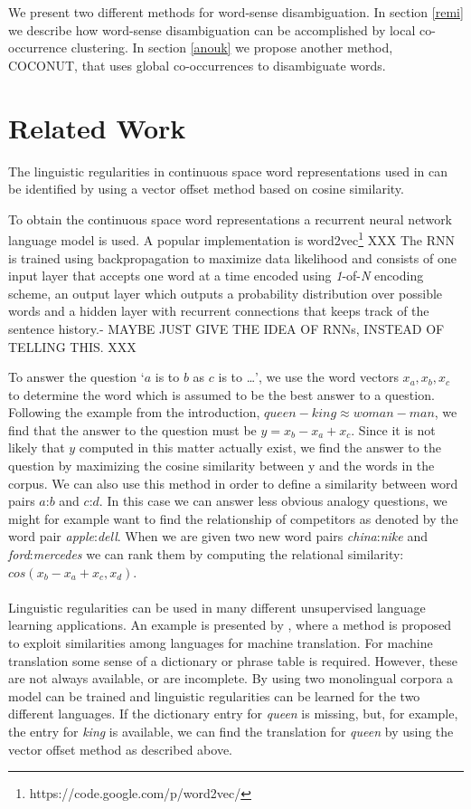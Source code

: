 \documentclass[11pt]{article}
\begin{document}
We present two different methods for word-sense disambiguation. In section \ref{remi} we describe how word-sense disambiguation can be accomplished by local co-occurrence clustering. In section \ref{anouk} we propose another method, COCONUT, that uses global co-occurrences to disambiguate words.

\section{Related Work}
The linguistic regularities in continuous space word representations used in \cite{Mikolov:13} can be identified by using a vector offset method based on cosine similarity. 

To obtain the continuous space word representations a recurrent neural network language model is used. A popular implementation is word2vec\footnote{https://code.google.com/p/word2vec/}
XXX The RNN is trained using backpropagation to maximize data likelihood and consists of one input layer that accepts one word at a time encoded using \textit{1}-of-\textit{N} encoding scheme, an output layer which outputs a probability distribution over possible words and a hidden layer with recurrent connections that keeps track of the sentence history.- MAYBE JUST GIVE THE IDEA OF RNNs, INSTEAD OF TELLING THIS. XXX

To answer the question `$a$ is to $b$ as $c$ is to \dots', we use the word vectors $x_a, x_b, x_c$ to determine the word which is assumed to be the best answer to a question. Following the example from the introduction, $\textit{queen} - \textit{king} \approx \textit{woman}  -\textit{man}$, we find that the answer to the question must be $y = x_b - x_a + x_c$. Since it is not likely that $y$ computed in this matter actually exist, we find the answer to the question by maximizing the cosine similarity between y and the words in the corpus. We can also use this method in order to define a similarity between word pairs $a$:$b$ and $c$:$d$. In this case we can answer less obvious analogy questions, we might for example want to find the relationship of competitors as denoted by the word pair \textit{apple}:\textit{dell}. When we are given two new word pairs \textit{china}:\textit{nike} and \textit{ford}:\textit{mercedes} we can rank them by computing the relational similarity: $cos(x_b - x_a + x_c, x_d)$.\\\\
Linguistic regularities can be used in many different unsupervised language learning applications. An example is presented by \cite{MikolovMT:13}, where a method is proposed to exploit similarities among languages for machine translation. For machine translation some sense of a dictionary or phrase table is required. However, these are not always available, or are incomplete. By using two monolingual corpora a model can be trained and linguistic regularities can be learned for the two different languages. If the dictionary entry for \textit{queen} is missing, but, for example, the entry for \textit{king} is available, we can find the translation for \textit{queen} by using the vector offset method as described above.
\end{document}

